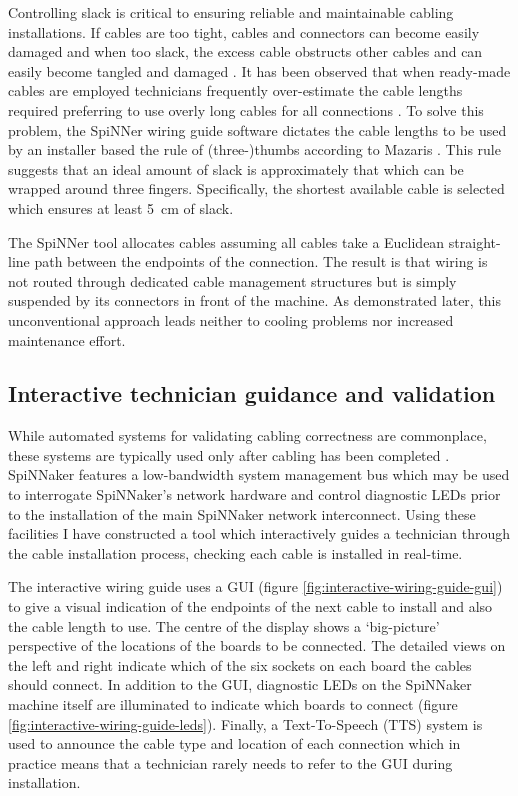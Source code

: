 			Controlling slack is critical to ensuring reliable and maintainable
			cabling installations. If cables are too tight, cables and connectors can
			become easily damaged and when too slack, the excess cable obstructs
			other cables and can easily become tangled and damaged \cite{cisco07}. It
			has been observed that when ready-made cables are employed technicians
			frequently over-estimate the cable lengths required preferring to use
			overly long cables for all connections \cite{mazaris97}. To solve this
			problem, the SpiNNer wiring guide software dictates the cable lengths to
			be used by an installer based the rule of (three-)thumbs according to
			Mazaris \cite{mazaris97}. This rule suggests that an ideal amount of
			slack is approximately that which can be wrapped around three fingers.
			Specifically, the shortest available cable is selected which ensures at
			least \SI{5}{\centi\meter} of slack.
			
			The SpiNNer tool allocates cables assuming all cables take a Euclidean
			straight-line path between the endpoints of the connection. The result is
			that wiring is not routed through dedicated cable management structures
			but is simply suspended by its connectors in front of the machine. As
			demonstrated later, this unconventional approach leads neither to cooling
			problems nor increased maintenance effort.
		
		\subsection{Interactive technician guidance and validation}
			
			While automated systems for validating cabling correctness are
			commonplace, these systems are typically used only after cabling has been
			completed \cite{lakner07}. SpiNNaker features a low-bandwidth system
			management bus which may be used to interrogate SpiNNaker's network
			hardware and control diagnostic LEDs prior to the installation of the
			main SpiNNaker network interconnect. Using these facilities I have
			constructed a tool which interactively guides a technician through the
			cable installation process, checking each cable is installed in
			real-time.
			
			The interactive wiring guide uses a GUI (figure
			\ref{fig:interactive-wiring-guide-gui}) to give a visual indication of
			the endpoints of the next cable to install and also the cable length to
			use. The centre of the display shows a `big-picture' perspective of the
			locations of the boards to be connected. The detailed views on the left
			and right indicate which of the six sockets on each board the cables
			should connect. In addition to the GUI, diagnostic LEDs on the SpiNNaker
			machine itself are illuminated to indicate which boards to connect
			(figure \ref{fig:interactive-wiring-guide-leds}). Finally, a
			Text-To-Speech (TTS) system is used to announce the cable type and
			location of each connection which in practice means that a technician
			rarely needs to refer to the GUI during installation.
			
